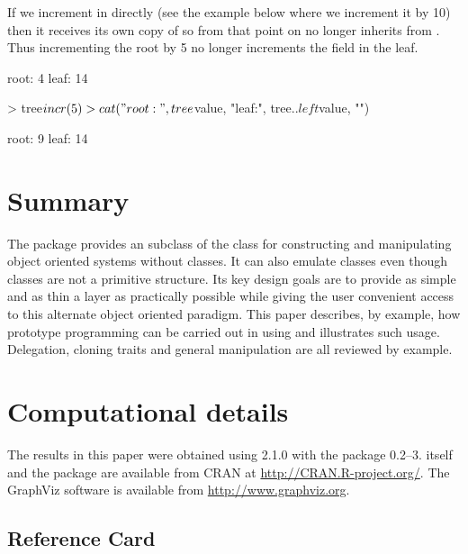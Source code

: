 \documentclass{Z}
\begin{document}
If we increment  in  directly (see the example
below where we increment it by 10) then it receives its own copy of
 so from that point on  no longer inherits
 from .  Thus incrementing the root by 5 no
longer increments the  field in the leaf.

\begin{Schunk}
\begin{Soutput}
root: 4 leaf: 14 
\end{Soutput}
\begin{Sinput}
> tree$incr(5)
> cat("root:", tree$value, "leaf:", tree$..left$value, "\n")
\end{Sinput}
\begin{Soutput}
root: 9 leaf: 14 
\end{Soutput}
\end{Schunk}

\section{Summary} \label{sec:summary}

The package  provides an  subclass of the
 class for constructing and manipulating object
oriented systems without classes.  It can also emulate classes even
though classes are not a primitive structure.  Its key design goals
are to provide as simple and as thin a layer as practically possible
while giving the user convenient access to this alternate object
oriented paradigm.  This paper describes, by example, how prototype
programming can be carried out in  using  and
illustrates such usage.  Delegation, cloning traits and general
manipulation are all reviewed by example.

\section*{Computational details}

The results in this paper were obtained using  2.1.0 with
the package  0.2--3.  itself and the
 package are available from CRAN at
\url{http://CRAN.R-project.org/}.  The GraphViz software is available
from \url{http://www.graphviz.org}.




\newpage\mbox{}
\begin{appendix}
\section{Reference Card}
\label{sec:ref}

\end{appendix}
\end{document}
